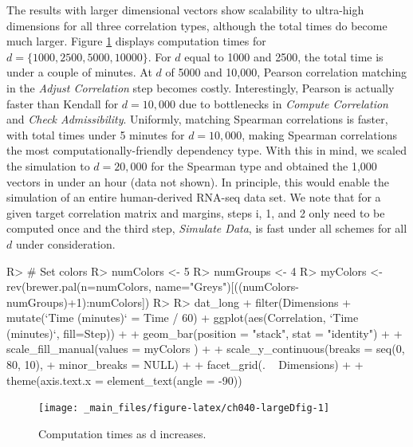 \documentclass[
]{jss}
\begin{document}
\begin{CodeChunk}
\end{CodeChunk}

The results with larger dimensional vectors show scalability to ultra-high dimensions for all three correlation types, although the total times do become much larger.
Figure \ref{fig:ch040-largeDfig} displays computation times for \(d=\{1000, 2500, 5000, 10000\}\). For \(d\) equal to 1000 and 2500, the total time is under a couple of minutes. At \(d\) of 5000 and 10,000, Pearson correlation matching in the \emph{Adjust Correlation} step becomes costly. Interestingly, Pearson is actually faster than Kendall for \(d=10,000\) due to bottlenecks in \emph{Compute Correlation} and \emph{Check Admissibility}. Uniformly, matching Spearman correlations is faster, with total times under 5 minutes for \(d=10,000\), making Spearman correlations the most computationally-friendly dependency type. With this in mind, we scaled the simulation to \(d=20,000\) for the Spearman type and obtained the 1,000 vectors in under an hour (data not shown). In principle, this would enable the simulation of an entire human-derived RNA-seq data set. We note that for a given target correlation matrix and margins, steps i, 1, and 2 only need to be computed once and the third step, \emph{Simulate Data}, is fast under all schemes for all \(d\) under consideration.

\begin{CodeChunk}
\begin{CodeInput}
R> # Set colors
R> numColors <- 5
R> numGroups <- 4
R> myColors <- rev(brewer.pal(n=numColors, name="Greys")[((numColors-numGroups)+1):numColors])
R> 
R> dat_long %
+     filter(Dimensions %
+     mutate(`Time (minutes)` = Time / 60) %
+     ggplot(aes(Correlation, `Time (minutes)`, fill=Step)) +
+     geom_bar(position = "stack", stat = "identity") +
+     scale_fill_manual(values = myColors ) +
+     scale_y_continuous(breaks = seq(0, 80, 10),
+                      minor_breaks = NULL) +
+     facet_grid(. ~ Dimensions) +
+     theme(axis.text.x = element_text(angle = -90))
\end{CodeInput}
\begin{figure}

{\centering \texttt{[image: \_main\_files/figure-latex/ch040-largeDfig-1]} 

}

\caption[Computation times as d increases]{Computation times as d increases.}\label{fig:ch040-largeDfig}
\end{figure}
\end{CodeChunk}
\end{document}
